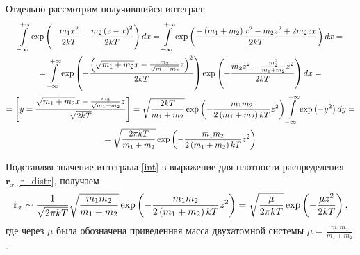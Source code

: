 \documentclass[12pt]{article}
\newcommand{\lb}{\left(}
\newcommand{\rb}{\right)}
\newcommand{\mf}{\mathbf}
\newcommand{\intty}{\int\limits_{-\infty}^{+\infty}}
\begin{document}
\begin{appendices}
Отдельно рассмотрим получившийся интеграл:
\begin{gather}
		\intty \exp \lb - \frac{m_1 x^2}{2 k T} - \frac{m_2 \lb z - x \rb^2}{2 k T} \rb dx = \intty \exp \lb \frac{- \lb m_1 + m_2 \rb x^2 - m_2 z^2 + 2 m_2 z x}{2 k T} \rb dx = \notag \\
		= \intty \exp \lb - \frac{\lb \sqrt{m_1 + m_2} x - \frac{m_2}{\sqrt{m_1 + m_2}} z \rb^2}{2 k T} \rb \exp \lb - \frac{m_2 z^2 - \frac{m_2^2}{m_1 + m_2} z^2 }{2 k T} \rb dx = \notag \\
		= \left[ y = \frac{ \sqrt{m_1 + m_2} x - \frac{m_2}{\sqrt{m_1 + m_2}} z}{ \sqrt{2 k T} } \right] = \sqrt{ \frac{2 k T}{m_ 1 + m_2} } \exp \lb - \frac{m_1 m_2}{2 \lb m_1 + m_2 \rb k T} z^2 \rb \intty \exp \lb - y^2 \rb dy = \notag \\
		= \sqrt{ \frac{2 \pi k T}{m_1 + m_2} } \exp \lb - \frac{m_1 m_2}{2 \lb m_1 + m_2 \rb k T} z^2 \rb \label{int}
\end{gather}

Подставляя значение интеграла \eqref{int} в выражение для плотности распределения $\dot{\mf{r}}_x$ \eqref{r_distr}, получаем
\begin{gather}
		\dot{\mf{r}}_x \sim \frac{1}{\sqrt{2 \pi k T}} \sqrt{ \frac{m_1 m_2}{m_1 + m_2} } \exp \lb - \frac{m_1 m_2}{2 \lb m_1 + m_2 \rb k T} z^2 \rb = \sqrt{ \frac{\mu}{2 \pi k T} } \exp \lb - \frac{\mu z^2}{2 k T} \rb \notag, 
\end{gather}
где через $\mu$ была обозначена приведенная масса двухатомной системы $ \mu = \displaystyle \frac{m_1 m_2}{m_1 + m_2} $.


\end{appendices}
\end{document}
